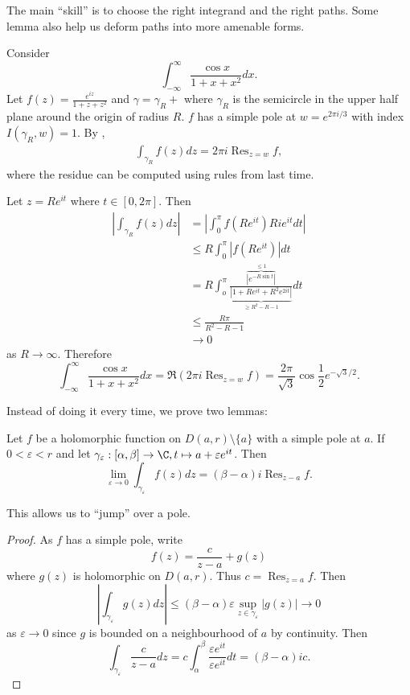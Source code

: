 \documentclass[a4paper]{article}
\DeclareMathOperator*{\res}{Res}
\begin{document}
The main ``skill'' is to choose the right integrand and the right paths. Some lemma also help us deform paths into more amenable forms.

\begin{eg}
  Consider
  \[
    \int_{-\infty}^\infty \frac{\cos x}{1 + x + x^2} dx.
  \]
  Let \(f(z) = \frac{e^{iz}}{1 + z + z^2}\) and \(\gamma = \gamma_R + \) where \(\gamma_R\) is the semicircle in the upper half plane around the origin of radius \(R\). \(f\) has a simple pole at \(w = e^{2\pi i/3}\) with index \(I(\gamma_R, w) = 1\). By ,
  \begin{align*}
    \int_{\gamma_R} f(z) dz = 2\pi i \res_{z = w} f,
  \end{align*}
  where the residue can be computed using rules from last time.

  Let \(z = Re^{it}\) where \(t \in [0, 2\pi]\). Then
  \begin{align*}
    \left| \int_{\gamma_R} f(z) dz \right|
    &= \left| \int_0^\pi f(Re^{it})Rie^{it} dt \right| \\
    &\leq R \int_0^\pi |f(Re^{it})| dt \\
    &= R \int_o^\pi \frac{\overbrace{|e^{-R\sin t}|}^{\leq 1}}{\underbrace{|1 + Re^{it} + R^2e^{2it}|}_{\geq R^2 - R - 1}} dt \\
    &\leq \frac{R\pi}{R^2 - R - 1} \\
    &\to 0
  \end{align*}
  as \(R \to \infty\). Therefore
  \[
    \int_{-\infty}^\infty \frac{\cos x}{1 + x + x^2} dx = \Re (2\pi i \res_{z = w} f) = \frac{2\pi}{\sqrt 3} \cos \frac{1}{2} e^{-\sqrt 3/2}.
  \]
\end{eg}

Instead of doing it every time, we prove two lemmas:

\begin{lemma}
  Let \(f\) be a holomorphic function on \(D(a, r) \setminus \{a\}\) with a simple pole at \(a\). If \(0 < \varepsilon < r\) and let \(\gamma_\varepsilon: [\alpha, \beta] \to \C, t \mapsto a + \varepsilon e^{it}\). Then
  \[
    \lim_{\varepsilon \to 0} \int_{\gamma_\varepsilon} f(z) dz = (\beta - \alpha) i \res_{z - a} f.
  \]
\end{lemma}

This allows us to ``jump'' over a pole.

\begin{proof}
  As \(f\) has a simple pole, write
  \[
    f(z) = \frac{c}{z - a} + g(z)
  \]
  where \(g(z)\) is holomorphic on \(D(a, r)\). Thus \(c = \res_{z = a} f\). Then
  \[
    \left| \int_{\gamma_\varepsilon} g(z) dz \right| \leq (\beta - \alpha) \varepsilon \sup_{z \in \gamma_\varepsilon} |g(z)| \to 0
  \]
  as \(\varepsilon \to 0\) since \(g\) is bounded on a neighbourhood of \(a\) by continuity. Then
  \[
    \int_{\gamma_\varepsilon} \frac{c}{z - a} dz = c \int_\alpha^\beta \frac{\varepsilon e^{it}}{\varepsilon e^{it}} dt = (\beta - \alpha)ic.
  \]
\end{proof}
\end{document}
